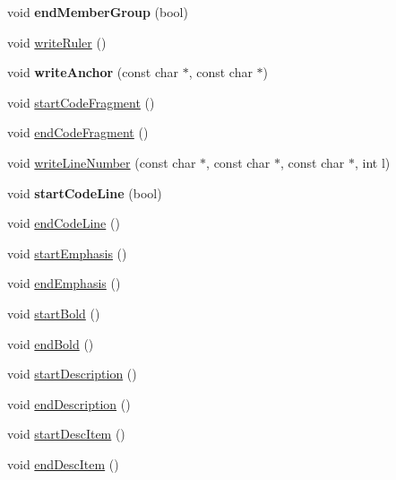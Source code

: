 \begin{DoxyCompactItemize}
\mbox{\label{class_man_generator_a93050bd4f7fd8c3181a65b7967b167ea}} 
void {\bfseries end\+Member\+Group} (bool)
\item 
void \mbox{\hyperlink{class_man_generator_ab7a5373b1e631879e56bf5699e00cfe2}{write\+Ruler}} ()
\item 
\mbox{\label{class_man_generator_a196669b4dd3c70556bf585925ae824fe}} 
void {\bfseries write\+Anchor} (const char $\ast$, const char $\ast$)
\item 
void \mbox{\hyperlink{class_man_generator_a23377579a34bc5cee9a43885888dd5d4}{start\+Code\+Fragment}} ()
\item 
void \mbox{\hyperlink{class_man_generator_a4e825c27561ebb51c155840d9101725a}{end\+Code\+Fragment}} ()
\item 
void \mbox{\hyperlink{class_man_generator_a3fe4aad0243fbecd3b746448a9373d3c}{write\+Line\+Number}} (const char $\ast$, const char $\ast$, const char $\ast$, int l)
\item 
\mbox{\label{class_man_generator_a2690c4b3d068da46f8a6804d43fd34e7}} 
void {\bfseries start\+Code\+Line} (bool)
\item 
void \mbox{\hyperlink{class_man_generator_a0f0040036147c71754651d0701029f70}{end\+Code\+Line}} ()
\item 
void \mbox{\hyperlink{class_man_generator_a8a88956b0c96590290287835934344b9}{start\+Emphasis}} ()
\item 
void \mbox{\hyperlink{class_man_generator_a3e158ae587148e66ad6f3d4df509ca35}{end\+Emphasis}} ()
\item 
void \mbox{\hyperlink{class_man_generator_a93a20331a8e073df653ed1df9834361b}{start\+Bold}} ()
\item 
void \mbox{\hyperlink{class_man_generator_acc9e3c928bd473ce079e323f19948dc7}{end\+Bold}} ()
\item 
void \mbox{\hyperlink{class_man_generator_a40c97f2dcd8827c13a9d1eedb96701b5}{start\+Description}} ()
\item 
void \mbox{\hyperlink{class_man_generator_a04db9176fd114182d5aab2a48346621d}{end\+Description}} ()
\item 
void \mbox{\hyperlink{class_man_generator_a3230aa59d50e8bdbbfb94e56bd956f56}{start\+Desc\+Item}} ()
\item 
void \mbox{\hyperlink{class_man_generator_ab86f06d399e075e2b6855319bf26e1ec}{end\+Desc\+Item}} ()

\end{DoxyCompactItemize}
